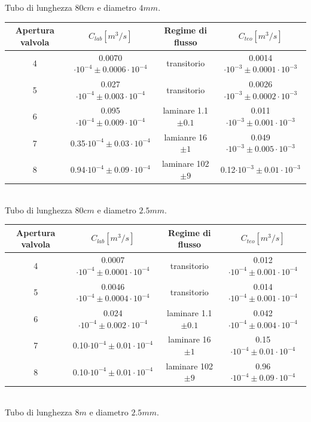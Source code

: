 \documentclass[a4paper,11pt]{article}
\begin{document}
\begin{center}
Tubo di lunghezza $80cm$ e diametro $4mm$.
\\
\vspace{15pt}
\begin{tabular}{|c|c|c|c|}
\hline Apertura valvola & $C_{lab} [m^3/s]$ & Regime di flusso & $C_{teo} [m^3/s]$ \\ 
\hline 4 & 0.0070$\cdot10^{-4}\pm 0.0006\cdot10^{-4}$ & transitorio & 0.0014$\cdot10^{-3}\pm 0.0001\cdot10^{-3}$ \\ 
\hline 5 & 0.027$\cdot10^{-4}\pm 0.003\cdot10^{-4}$ & transitorio & 0.0026$\cdot10^{-3}\pm 0.0002\cdot10^{-3}$ \\ 
\hline 6 & 0.095$\cdot10^{-4}\pm 0.009\cdot10^{-4}$ & laminare 1.1$\pm0.1$ & 0.011$\cdot10^{-3}\pm 0.001\cdot10^{-3}$\\
\hline 7 & 0.35$\cdot10^{-4}\pm 0.03\cdot10^{-4}$ & lamianre 16$\pm1$ & 0.049$\cdot10^{-3}\pm 0.005\cdot10^{-3}$ \\
\hline 8 & 0.94$\cdot10^{-4}\pm 0.09\cdot10^{-4}$ & laminare 102$\pm9$ & 0.12$\cdot10^{-3}\pm 0.01\cdot10^{-3}$ \\ 
\hline 
\end{tabular}\\
\vspace{5pt}
Tubo di lunghezza $80cm$ e diametro $2.5mm$.
\\
\vspace{15pt}
\begin{tabular}{|c|c|c|c|}
\hline Apertura valvola & $C_{lab} [m^3/s]$ & Regime di flusso & $C_{teo} [m^3/s]$ \\ 
\hline 4 & 0.0007$\cdot10^{-4}\pm 0.0001\cdot10^{-4}$ & transitorio & 0.012$\cdot10^{-4}\pm 0.001\cdot10^{-4}$ \\ 
\hline 5 & 0.0046$\cdot10^{-4}\pm 0.0004\cdot10^{-4}$ & transitorio & 0.014$\cdot10^{-4}\pm 0.001\cdot10^{-4}$ \\ 
\hline 6 & 0.024$\cdot10^{-4}\pm 0.002\cdot10^{-4}$ & laminare 1.1$\pm0.1$ & 0.042$\cdot10^{-4}\pm 0.004\cdot10^{-4}$ \\
\hline 7 & 0.10$\cdot10^{-4}\pm 0.01\cdot10^{-4}$ & laminare 16$\pm1$ & 0.15$\cdot10^{-4}\pm 0.01\cdot10^{-4}$ \\
\hline 8 & 0.10$\cdot10^{-4}\pm 0.01\cdot10^{-4}$ & laminare 102$\pm9$ & 0.96$\cdot10^{-4}\pm 0.09\cdot10^{-4}$ \\ 
\hline 
\end{tabular}\\
\vspace{5pt}
Tubo di lunghezza $8m$ e diametro $2.5mm$.
\\

\end{center}
\end{document}
